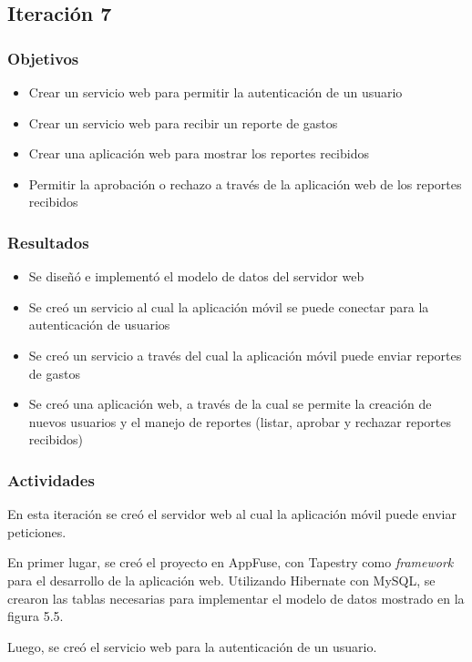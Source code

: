 \subsection{Iteración 7}
\subsubsection{Objetivos}
\begin{itemize}
\item Crear un servicio web para permitir la autenticación de un usuario
\item Crear un servicio web para recibir un reporte de gastos
\item Crear una aplicación web para mostrar los reportes recibidos
\item Permitir la aprobación o rechazo a través de la aplicación web de los reportes recibidos
\end{itemize}
\subsubsection{Resultados}
\begin{itemize}
\item Se diseñó e implementó el modelo de datos del servidor web
\item Se creó un servicio al cual la aplicación móvil se puede conectar para la autenticación de usuarios
\item Se creó un servicio a través del cual la aplicación móvil puede enviar reportes de gastos
\item Se creó una aplicación web, a través de la cual se permite la creación de nuevos usuarios y el manejo de reportes (listar, aprobar y rechazar reportes recibidos)
\end{itemize}

\subsubsection{Actividades}

En esta iteración se creó el servidor web al cual la aplicación móvil puede enviar peticiones.

En primer lugar, se creó el proyecto en AppFuse, con Tapestry como \textit{framework} para el desarrollo de la aplicación web. Utilizando Hibernate con MySQL, se crearon las tablas necesarias para implementar el modelo de datos mostrado en la figura 5.5.

Luego, se creó el servicio web para la autenticación de un usuario. 

